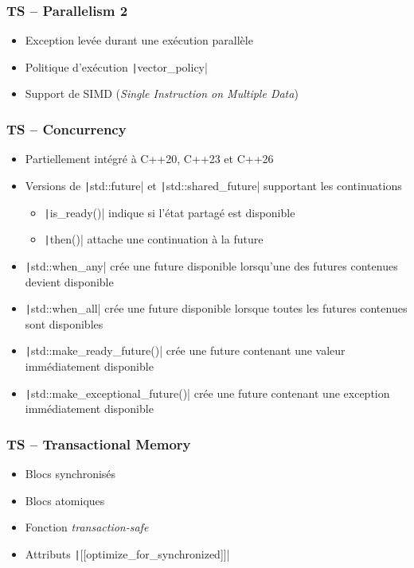\documentclass[C++.tex]{subfiles}
\begin{document}
\begin{frame}[fragile]
	\frametitle{TS -- Parallelism 2}
	\begin{itemize}
		\item Exception levée durant une exécution parallèle
		\item Politique d'exécution \texttt|vector_policy|
		\item Support de SIMD (\textit{Single Instruction on Multiple Data})
	\end{itemize}

\end{frame}

\begin{frame}[fragile]
	\frametitle{TS -- Concurrency}
	\begin{itemize}
		\item Partiellement intégré à C++20, C++23 et C++26
		\item Versions de \texttt|std::future| et \texttt|std::shared_future| supportant les continuations
		\begin{itemize}
			\item \texttt|is_ready()| indique si l'état partagé est disponible
			\item \texttt|then()| attache une continuation à la future
		\end{itemize}
		\item \texttt|std::when_any| crée une future disponible lorsqu'une des futures contenues devient disponible
		\item \texttt|std::when_all| crée une future disponible lorsque toutes les futures contenues sont disponibles
		\item \texttt|std::make_ready_future()| crée une future contenant une valeur immédiatement disponible
		\item \texttt|std::make_exceptional_future()| crée une future contenant une exception immédiatement disponible
	\end{itemize}

\end{frame}

\begin{frame}[fragile]
	\frametitle{TS -- Transactional Memory}
	\begin{itemize}
		\item Blocs synchronisés
		\item Blocs atomiques
		\item Fonction \textit{transaction-safe}
		\item Attributs \texttt|[[optimize_for_synchronized]]|
	\end{itemize}

\end{frame}
\end{document}
